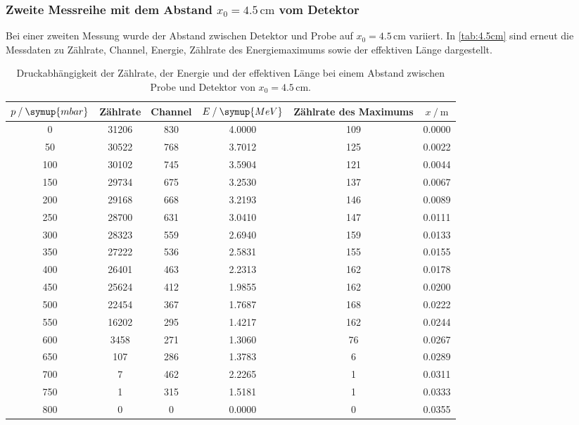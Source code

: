 \subsubsection{Zweite Messreihe mit dem Abstand $x_0= 4.5\, \unit{\cm}$ vom Detektor}
Bei einer zweiten Messung wurde der Abstand zwischen Detektor und Probe auf $x_0 = 4.5 \,\unit{\cm}$ variiert. In \autoref{tab:4.5cm} sind erneut die 
Messdaten zu Zählrate, Channel, Energie, Zählrate des Energiemaximums sowie der effektiven Länge dargestellt.

\begin{table}
  \centering
  \caption{Druckabhängigkeit der Zählrate, der Energie und der effektiven Länge bei einem Abstand zwischen Probe und Detektor von $x_0 = 4.5\,\unit{\cm}$.}
\begin{tabular}{c c c c c c}
  \toprule
  $p \mathbin{/}\symup{mbar}$ &Zählrate& Channel & $E \mathbin{/}\symup{MeV}$ & Zählrate des Maximums & $x \mathbin{/}\unit{\m}$ \\
  \midrule
                    0&31206&830&4.0000&109&0.0000 \\
                    50&30522&768&3.7012&125&0.0022 \\
                   100&30102&745&3.5904&121&0.0044 \\
                   150&29734&675&3.2530&137&0.0067 \\
                   200&29168&668&3.2193&146&0.0089 \\
                   250&28700&631&3.0410&147&0.0111 \\
                   300&28323&559&2.6940&159&0.0133 \\
                   350&27222&536&2.5831&155&0.0155 \\
                   400&26401&463&2.2313&162&0.0178 \\
                   450&25624&412&1.9855&162&0.0200 \\
                   500&22454&367&1.7687&168&0.0222 \\
                   550&16202&295&1.4217&162&0.0244 \\
                     600&3458&271&1.3060&76&0.0267 \\
                       650&107&286&1.3783&6&0.0289 \\
                         700&7&462&2.2265&1&0.0311 \\
                         750&1&315&1.5181&1&0.0333 \\
                           800&0&0&0.0000&0&0.0355 \\
  \bottomrule
  \end{tabular}
  \label{tab:4.5cm}
\end{table}

